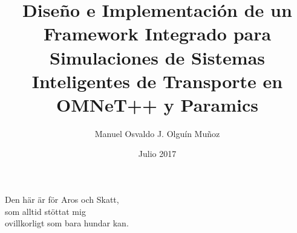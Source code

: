 \documentclass[upright, contnum]{umemoria}
\author{Manuel Osvaldo J. Olguín Muñoz}
\title{Diseño e Implementación de un Framework Integrado para Simulaciones de Sistemas Inteligentes de Transporte en OMNeT++ y Paramics}
\date{Julio 2017}
\begin{document}
\frontmatter
\maketitle

\begin{abstract}
\lipsum[1-4]
\end{abstract}

\begin{dedicatoria}
Den här är för Aros och Skatt,\\ som alltid stöttat mig\\ ovillkorligt som bara hundar kan.
\end{dedicatoria}



\cleardoublepage
\tableofcontents
\cleardoublepage
\listoftables
\cleardoublepage
\listoffigures

\mainmatter









\blankpage
\cleardoublepage

\printbibliography[heading=bibintoc]
    

\appendix

\end{document}
